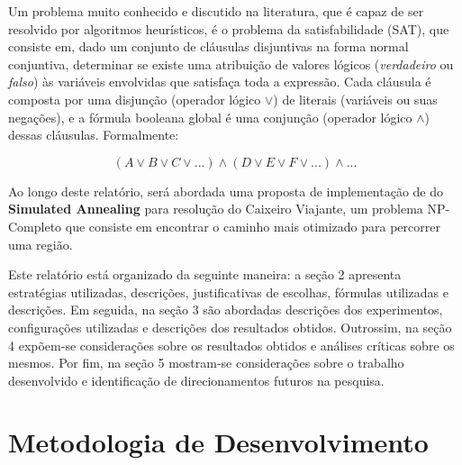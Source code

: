 \documentclass[12pt]{article}
\begin{document}
Um problema muito conhecido e discutido na literatura, que é capaz de ser resolvido por algoritmos heurísticos, é o problema da satisfabilidade (SAT), que consiste em, dado um conjunto de cláusulas disjuntivas na forma normal conjuntiva, determinar se existe uma atribuição de valores lógicos (\textit{verdadeiro} ou \textit{falso}) às variáveis envolvidas que satisfaça toda a expressão.
%
Cada cláusula é composta por uma disjunção (operador lógico $\lor$) de literais (variáveis ou suas negações), e a fórmula booleana global é uma conjunção (operador lógico $\land$) dessas cláusulas. Formalmente:

\begin{equation}
(A \lor B \lor C \lor ...) \land (D \lor E \lor F \lor ...) \land ...
\end{equation}

Ao longo deste relatório, será abordada uma proposta de implementação de do \textbf{Simulated Annealing} para resolução do Caixeiro Viajante, um problema NP-Completo que consiste em encontrar o caminho mais otimizado para percorrer uma região.

Este relatório está organizado da seguinte maneira: a seção 2 apresenta estratégias utilizadas, descrições, justificativas de escolhas, fórmulas utilizadas e descrições. Em seguida, na seção 3 são abordadas descrições dos experimentos, configurações utilizadas e descrições dos resultados obtidos. Outrossim, na seção 4 expõem-se considerações sobre os resultados obtidos e análises críticas sobre os mesmos. Por fim, na seção 5 mostram-se considerações sobre o trabalho desenvolvido e identificação de direcionamentos futuros na pesquisa.



\section{Metodologia de Desenvolvimento}
\label{sec:metodologia_de_desenvolvimento}
\end{document}
